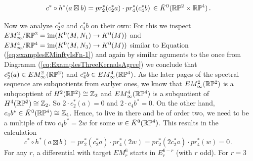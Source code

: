 	\begin{equation*}
		c^*\circ h^*(a\boxtimes b)=pr_2^*(c_2^*a)\cdot pr_4^*(c_4^*b)\,\in \tilde{K}^0(\mathbb{R}\mathbb{P}^2 \times  \mathbb{R}\mathbb{P}^4)\,.
	\end{equation*}

	Now we analyze $c_2^*a$ and $c_4^*b$ on their own: 
	For this we inspect $EM^2_{\infty}/\mathbb{R}\mathbb{P}^2=\mathrm{im}(K^0(M,N_1)\to K^0(M))$ and $EM^4_{\infty}/\mathbb{R}\mathbb{P}^4=\mathrm{im}(K^0(M,N_3)\to K^0(M))$ similar to Equation (\ref{eq:examplesEMinftyIsFn-1}) and again by similar aguments to the once from Diagramm (\ref{eq:ExamplesThreeKernalsAgree}) we conclude that $c_2^*(a)\in EM^2_{\infty}(\mathbb{R}\mathbb{P}^2)$ and $c_4^*b\in EM^4_{\infty}(\mathbb{R}\mathbb{P}^4)$. As the later pages of the spectral sequence are subquotients from earlyer ones, we know that $EM^2_{\infty}(\mathbb{R}\mathbb{P}^2)$ is a subquoptient of $H^2(\mathbb{R}\mathbb{P}^2)\cong\mathbb{Z}_2$ and $ EM^4_{\infty}(\mathbb{R}\mathbb{P}^4)$ is a subquotient of $H^4(\mathbb{R}\mathbb{P}^2)\cong \mathbb{Z}_2$. So $ 2\cdot c_2^*(a)=0$ and $2\cdot c_4b^*=0$. On the other hand, $c_4b^*\in \tilde{K}^0(\mathbb{R}\mathbb{P}^4)\cong \mathbb{Z}_4$. Hence, to live in there and be of order two, we need to be a multiple of two $c_4b^*=2w$ for some $w\in \tilde{K}^0(\mathbb{R}\mathbb{P}^4)$. This results in the calculation
	\begin{equation*}
		c^*\circ h^*(a\boxtimes b)=pr_2^*(c_2^*a)\cdot pr_4^*(2w)=pr_2^*(2c_2^*a)\cdot pr_4^*(w)=0\,.
	\end{equation*} For any $r$, a differential with target $EM^6_r$ starts in $E^{6-r}_r$ (with $r$ odd). For $r=3$ 
	
	
	
	
	
	
	
	
	
	
	
	
	
	
	
